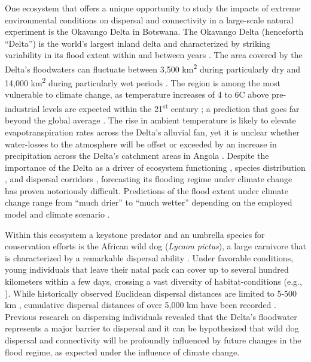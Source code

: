 \documentclass[../FinalThesis.tex]{subfiles}
\begin{document}
One ecosystem that offers a unique opportunity to study the impacts of extreme
environmental conditions on dispersal and connectivity in a large-scale natural
experiment is the Okavango Delta in Botswana. The Okavango Delta (henceforth
``Delta'') is the world's largest inland delta and characterized by striking
variability in its flood extent within and between years \citep{Gumbricht.2004,
Wolski.2017}. The area covered by the Delta's floodwaters can fluctuate between
3,500 km\textsuperscript{2} during particularly dry and 14,000
km\textsuperscript{2} during particularly wet periods \citep{McCarthy.2003,
Gumbricht.2004}. The region is among the most vulnerable to climate change, as
temperature increases of 4 to 6\degree C above pre-industrial levels are
expected within the 21\textsuperscript{st} century \citep{Engelbrecht.2015,
Akinyemi.2019}; a prediction that goes far beyond the global average
\citep{IPCC.2022}. The rise in ambient temperature is likely to elevate
evapotranspiration rates across the Delta's alluvial fan, yet it is unclear
whether water-losses to the atmosphere will be offset or exceeded by an increase
in precipitation across the Delta's catchment areas in Angola
\citep{Wolski.2008, IPCC.2022}. Despite the importance of the Delta as a driver
of ecosystem functioning \citep{Wolski.2008}, species distribution
\citep{Bonyongo.2005, Bennitt.2014}, and dispersal corridors
\citep{Hofmann.2021, Hofmann.2023}, forecasting its flooding regime under
climate change has proven notoriously difficult. Predictions of the flood extent
under climate change range from ``much drier'' to ``much wetter'' depending on
the employed model and climate scenario \citep{Murray-Hudson.2006, Wolski.2008}.

Within this ecosystem a keystone predator and an umbrella species for
conservation efforts is the African wild dog (\textit{Lycaon pictus}), a large
carnivore that is characterized by a remarkable dispersal ability
\citep{McNutt.1996, Davies-Mostert.2012, Masenga.2016, Cozzi.2020,
Sandoval-Seres.2022}. Under favorable conditions, young individuals that leave
their natal pack can cover up to several hundred kilometers within a few days,
crossing a vast diversity of habitat-conditions (e.g., \citealp{Cozzi.2020}).
While historically observed Euclidean dispersal distances are limited to 5-500
km \citep{Davies-Mostert.2012, Cozzi.2020, Sandoval-Seres.2022}, cumulative
dispersal distances of over 5,000 km have been recorded \citep{Masenga.2016}.
Previous research on dispersing individuals revealed that the Delta's
floodwater represents a major barrier to dispersal \citep{Hofmann.2021,
Hofmann.2023} and it can be hypothesized that wild dog dispersal and
connectivity will be profoundly influenced by future changes in the flood
regime, as expected under the influence of climate change.
\end{document}
